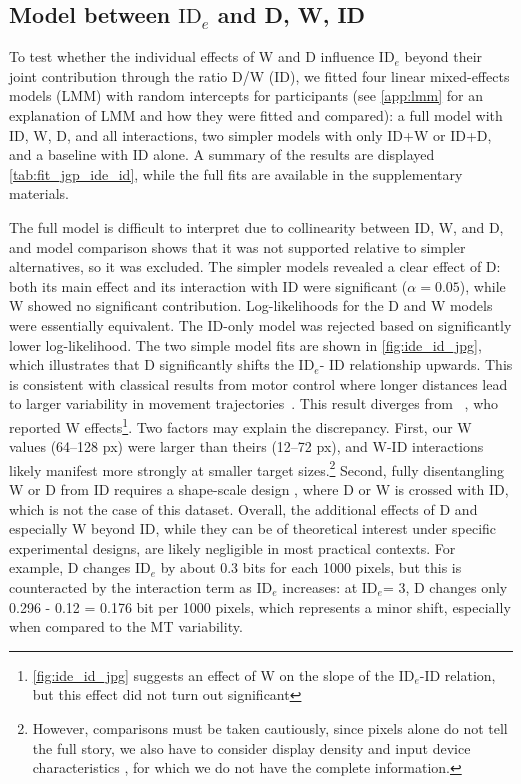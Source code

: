 \documentclass[acmlarge, manuscript,review]{acmart}
\newcommand{\ide}{\ensuremath{{\text{ID}_e}}\xspace}
\begin{document}
\subsection{Model between \ide and D, W, ID\label{sub:jgp_id}} 
To test whether the individual effects of W and D influence \ide beyond their joint contribution through the ratio D/W (ID), we fitted four linear mixed-effects models (LMM) with random intercepts for participants (see \autoref{app:lmm} for an explanation of LMM and how they were fitted and compared): a full model with ID, W, D, and all interactions, two simpler models with only ID+W or ID+D, and a baseline with ID alone.
A summary of the results are displayed \autoref{tab:fit_jgp_ide_id}, while the full fits are available in the supplementary materials.


The full model is difficult to interpret due to collinearity between ID, W, and D, and model comparison shows that it was not supported relative to simpler alternatives, so it was excluded. The simpler models revealed a clear effect of D: both its main effect and its interaction with ID were significant ($\alpha=0.05$), while W showed no significant contribution. Log-likelihoods for the D and W models were essentially equivalent. The ID-only model was rejected based on significantly lower log-likelihood.
The two simple model fits are shown in \autoref{fig:ide_id_jpg}, which illustrates that D significantly shifts the \ide - ID relationship upwards. This is consistent with classical results from motor control where longer distances lead to larger variability in movement trajectories~\cite{gori2020}. 
This result diverges from \citeauthor{zhai2004nominal}~\cite{zhai2004nominal}, who reported W effects\footnote{\autoref{fig:ide_id_jpg} suggests an effect of W on the slope of the \ide-ID relation, but this effect did not turn out significant}. Two factors may explain the discrepancy. First, our W values (64--128 px) were larger than theirs (12--72 px), and W-ID interactions likely manifest more strongly at smaller target sizes.\footnote{However, comparisons must be taken cautiously, since pixels alone do not tell the full story, we also have to consider display density and input device characteristics \cite{casiez2011}, for which we do not have the complete information.} Second, fully disentangling W or D from ID requires a shape-scale design \cite{gori2018chi, guiard2009}, where D or W is crossed with ID, which is not the case of this dataset.
Overall, the additional effects of D and especially W beyond ID, while they can be of theoretical interest under specific experimental designs, are likely negligible in most practical contexts. For example, D changes \ide by about 0.3 bits for each 1000 pixels, but this is counteracted by the interaction term as \ide increases: at \ide = 3, D changes only 0.296 - 0.12 = 0.176 bit per 1000 pixels, which represents a minor shift, especially when compared to the MT variability.
\end{document}
